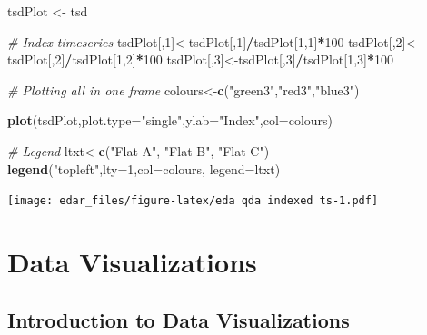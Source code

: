 \documentclass[
  a4paperpaper,
]{book}
\newenvironment{Shaded}{\begin{snugshade}}{\end{snugshade}}
\newcommand{\CommentTok}[1]{\textcolor[rgb]{0.56,0.35,0.01}{\textit{#1}}}
\newcommand{\DataTypeTok}[1]{\textcolor[rgb]{0.13,0.29,0.53}{#1}}
\newcommand{\DecValTok}[1]{\textcolor[rgb]{0.00,0.00,0.81}{#1}}
\newcommand{\KeywordTok}[1]{\textcolor[rgb]{0.13,0.29,0.53}{\textbf{#1}}}
\newcommand{\NormalTok}[1]{#1}
\newcommand{\OperatorTok}[1]{\textcolor[rgb]{0.81,0.36,0.00}{\textbf{#1}}}
\newcommand{\StringTok}[1]{\textcolor[rgb]{0.31,0.60,0.02}{#1}}
\let\oldShaded\Shaded
\let\endoldShaded\endShaded
\renewenvironment{Shaded}{\footnotesize\oldShaded}{\endoldShaded}
\begin{document}
\begin{Shaded}
\begin{Highlighting}[]
\NormalTok{tsdPlot <-}\StringTok{ }\NormalTok{tsd}

\CommentTok{# Index timeseries}
\NormalTok{tsdPlot[,}\DecValTok{1}\NormalTok{]<-tsdPlot[,}\DecValTok{1}\NormalTok{]}\OperatorTok{/}\NormalTok{tsdPlot[}\DecValTok{1}\NormalTok{,}\DecValTok{1}\NormalTok{]}\OperatorTok{*}\DecValTok{100}
\NormalTok{tsdPlot[,}\DecValTok{2}\NormalTok{]<-tsdPlot[,}\DecValTok{2}\NormalTok{]}\OperatorTok{/}\NormalTok{tsdPlot[}\DecValTok{1}\NormalTok{,}\DecValTok{2}\NormalTok{]}\OperatorTok{*}\DecValTok{100}
\NormalTok{tsdPlot[,}\DecValTok{3}\NormalTok{]<-tsdPlot[,}\DecValTok{3}\NormalTok{]}\OperatorTok{/}\NormalTok{tsdPlot[}\DecValTok{1}\NormalTok{,}\DecValTok{3}\NormalTok{]}\OperatorTok{*}\DecValTok{100}

\CommentTok{# Plotting all in one frame}
\NormalTok{colours<-}\KeywordTok{c}\NormalTok{(}\StringTok{"green3"}\NormalTok{,}\StringTok{"red3"}\NormalTok{,}\StringTok{"blue3"}\NormalTok{)}

\KeywordTok{plot}\NormalTok{(tsdPlot,}\DataTypeTok{plot.type=}\StringTok{"single"}\NormalTok{,}\DataTypeTok{ylab=}\StringTok{"Index"}\NormalTok{,}\DataTypeTok{col=}\NormalTok{colours)}

\CommentTok{# Legend}
\NormalTok{ltxt<-}\KeywordTok{c}\NormalTok{(}\StringTok{"Flat A"}\NormalTok{, }\StringTok{"Flat B"}\NormalTok{, }\StringTok{"Flat C"}\NormalTok{)}
\KeywordTok{legend}\NormalTok{(}\StringTok{"topleft"}\NormalTok{,}\DataTypeTok{lty=}\DecValTok{1}\NormalTok{,}\DataTypeTok{col=}\NormalTok{colours, }\DataTypeTok{legend=}\NormalTok{ltxt)}
\end{Highlighting}
\end{Shaded}

\texttt{[image: edar\_files/figure-latex/eda qda indexed ts-1.pdf]}

\hypertarget{part-data-visualizations}{%
\part{Data Visualizations}\label{part-data-visualizations}}

\hypertarget{introduction-to-data-visualizations}{%
\chapter{Introduction to Data Visualizations}\label{introduction-to-data-visualizations}}
\end{document}
